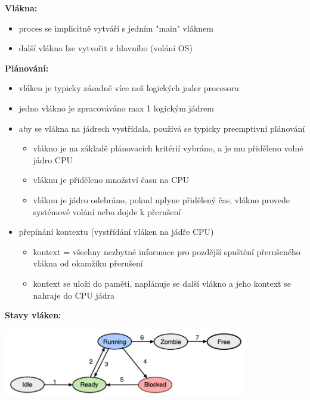 \textbf{Vlákna:}
\begin{itemize}
	\item proces se implicitně vytváří s jedním "main" vláknem
	\item další vlákna lze vytvořit z hlavního (volání OS)
\end{itemize}

\textbf{Plánování:} 
\begin{itemize}
	\item vláken je typicky zásadně více než logických jader procesoru
	\item jedno vlákno je zpracováváno max 1 logickým jádrem
	\item aby se vlákna na jádrech vystřídala, používá se typicky preemptivní plánování
	\begin{itemize}
		\item vlákno je na základě plánovacích kritérií vybráno, a je mu přiděleno volné jádro CPU
		\item vláknu je přiděleno množství času na CPU
		\item vláknu je jádro odebráno, pokud uplyne přidělený čas, vlákno provede systémové volání nebo dojde k přerušení
	\end{itemize}
	\item přepínání kontextu (vystřídání vláken na jádře CPU)
	\begin{itemize}
		\item kontext = všechny nezbytné informace pro pozdější spuštění přerušeného vlákna od okamžiku pře\-ru\-še\-ní
		\item kontext se uloží do paměti, naplánuje se další vlákno a jeho kontext se nahraje do CPU jádra
	\end{itemize}
\end{itemize}

\textbf{Stavy vláken:}

\includegraphics[width=0.8\textwidth]{img/SP-17_0.jpg}

